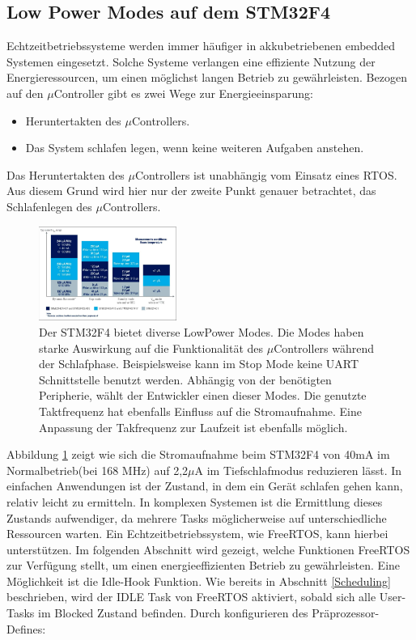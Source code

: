 \subsection{Low Power Modes auf dem STM32F4}
\label{sec:Low Power Modes}
Echtzeitbetriebssysteme werden immer häufiger in akkubetriebenen embedded Systemen eingesetzt. Solche Systeme verlangen eine effiziente Nutzung der Energieressourcen, um einen möglichst langen Betrieb zu ge\-währ\-leis\-ten. Bezogen auf den $\mu$Controller gibt es zwei Wege zur Energieeinsparung:
\begin{itemize}
	\item Heruntertakten des $\mu$Controllers.
	\item Das System schlafen legen, wenn keine weiteren Aufgaben anstehen.
\end{itemize}
Das Heruntertakten des $\mu$Controllers ist unabhängig vom Einsatz eines RTOS. Aus diesem Grund wird hier nur der zweite Punkt genauer betrachtet, das Schlafenlegen des $\mu$Controllers. 
\begin{figure}[htb!]
	\centering
		\includegraphics[width=0.4\textwidth]{Pictures/STM32F4/powerConsumption.png}
	\caption{Der STM32F4 bietet diverse LowPower Modes. Die Modes haben starke Auswirkung auf die Funktionalität des $\mu$Controllers während der Schlafphase. Beispielsweise kann im Stop Mode keine UART Schnittstelle benutzt werden. Abhängig von der benötigten Peripherie, wählt der Entwickler einen dieser Modes. Die genutzte Taktfrequenz hat ebenfalls Einfluss auf die Stromaufnahme. Eine Anpassung der Takfrequenz zur Laufzeit ist ebenfalls möglich.}
	\label{fig:powerconsum}
\end{figure}
Abbildung \ref{fig:powerconsum} zeigt wie sich die Stromaufnahme beim STM32F4 von 40mA im Normalbetrieb(bei 168 MHz) auf 2,2$\mu$A im Tiefschlafmodus reduzieren lässt. 
In einfachen Anwendungen ist der Zustand, in dem ein Gerät schlafen gehen kann, relativ leicht zu ermitteln. In komplexen Systemen ist die Ermittlung dieses Zustands aufwendiger, da mehrere Tasks mög\-li\-cherweise auf unterschiedliche Ressourcen warten. Ein Echtzeitbetriebssystem, wie FreeRTOS, kann hierbei unterstützen. Im folgenden Abschnitt wird gezeigt, welche Funktionen FreeRTOS zur Ver\-fü\-gung stellt, um einen energieeffizienten Betrieb zu ge\-währ\-leis\-ten. Eine Mög\-lich\-keit ist die Idle-Hook Funktion. Wie bereits in Abschnitt \ref{Scheduling} beschrieben, wird der IDLE Task von FreeRTOS aktiviert, sobald sich alle User-Tasks im Blocked Zustand befinden. Durch konfigurieren des Präprozessor-Defines:        
